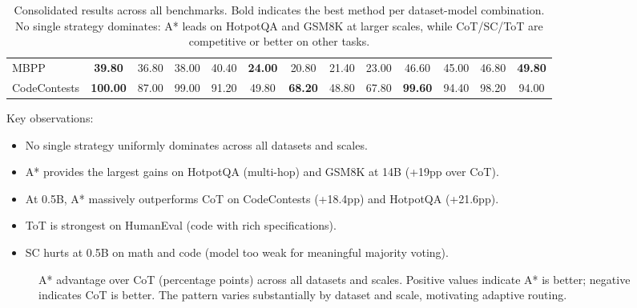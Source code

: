 \begin{table}[ht]
\begin{tabular}{lcccc|cccc|cccc}
MBPP & \textbf{39.80} & 36.80 & 38.00 & 40.40 & \textbf{24.00} & 20.80 & 21.40 & 23.00 & 46.60 & 45.00 & 46.80 & \textbf{49.80} \\
CodeContests & \textbf{100.00} & 87.00 & 99.00 & 91.20 & 49.80 & \textbf{68.20} & 48.80 & 67.80 & \textbf{99.60} & 94.40 & 98.20 & 94.00 \\
\bottomrule
\end{tabular}
\caption{Consolidated results across all benchmarks. Bold indicates the best method per dataset-model combination. No single strategy dominates: A* leads on HotpotQA and GSM8K at larger scales, while CoT/SC/ToT are competitive or better on other tasks.}
\label{tab:main_results}
\end{table}

Key observations:
\begin{itemize}
\item No single strategy uniformly dominates across all datasets and scales.
\item A* provides the largest gains on HotpotQA (multi-hop) and GSM8K at 14B (+19pp over CoT).
\item At 0.5B, A* massively outperforms CoT on CodeContests (+18.4pp) and HotpotQA (+21.6pp).
\item ToT is strongest on HumanEval (code with rich specifications).
\item SC hurts at 0.5B on math and code (model too weak for meaningful majority voting).
\end{itemize}

\begin{figure}[htbp]
\centering
{}
\caption{A* advantage over CoT (percentage points) across all datasets and scales. Positive values indicate A* is better; negative indicates CoT is better. The pattern varies substantially by dataset and scale, motivating adaptive routing.}
\label{fig:astar_advantage}
\end{figure}

